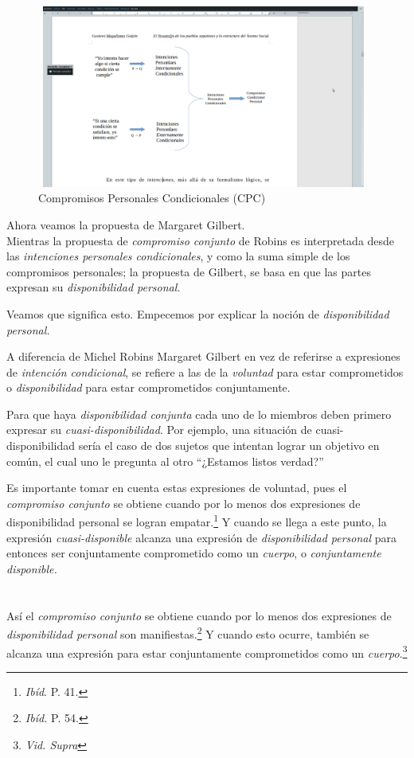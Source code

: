 \documentclass[oneside]{book}
\begin{document}
\begin{figure}[h]
	\centering
	\includegraphics[width=11cm, height=6cm]{img/esquemaRobins}
	\caption{Compromisos Personales Condicionales (CPC)}
\end{figure}
Ahora veamos la propuesta de Margaret Gilbert.
\\

Mientras la propuesta de \textit{compromiso conjunto} de Robins es interpretada desde las \textit{intenciones personales condicionales}, y como la suma simple de los compromisos personales; la propuesta de Gilbert, se basa en que las partes expresan su \textit{disponibilidad personal.}

Veamos que significa esto. Empecemos por explicar la noción de \textit{disponibilidad personal.}

A diferencia de Michel Robins Margaret Gilbert en vez de referirse a expresiones de \textit{intención condicional}, se refiere a las de la \textit{voluntad} para estar comprometidos o \textit{disponibilidad} para estar comprometidos conjuntamente.

Para que haya \textit{disponibilidad conjunta} cada uno de lo miembros deben primero expresar su \textit{cuasi-disponibilidad}.	Por ejemplo,  una situación de cuasi-disponibilidad sería el caso de dos sujetos que intentan lograr un objetivo en común, el cual uno le pregunta al otro “¿Estamos listos verdad?”

Es importante tomar en cuenta estas expresiones de voluntad, pues el \textit{compromiso conjunto} se obtiene cuando por lo menos dos expresiones de disponibilidad personal se logran empatar.\footnote{\textit{Ibíd}. P. 41.} Y cuando se llega a este punto, la expresión \textit{cuasi-disponible} alcanza una expresión de \textit{disponibilidad personal} para entonces ser conjuntamente comprometido como un \textit{cuerpo}, o \textit{conjuntamente disponible.}
\\
\\
\\
Así el \textit{compromiso conjunto} se obtiene cuando por lo menos dos expresiones de \textit{disponibilidad personal} son manifiestas.\footnote{\textit{Ibíd.} P. 54.} Y cuando esto ocurre, también se alcanza una expresión para estar conjuntamente comprometidos como un \textit{cuerpo}.\footnote{\textit{Vid. Supra}}
\end{document}
